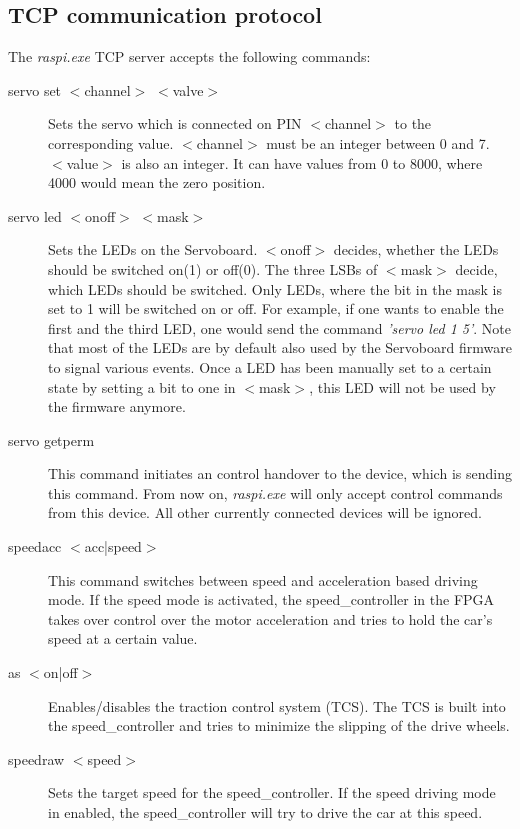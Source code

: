 \documentclass[a4paper
               ,10pt
               ,DIV=10 %
               ,BCOR=0.3cm
               ,pagesize %
               ,headings=small
               ,bibtotoc
               ]
               {scrartcl}
\begin{document}
\subsection{TCP communication protocol}
The \textit{raspi.exe} TCP server accepts the following commands:
\begin{description}
\item[servo set $<$channel$>$ $<$valve$>$] Sets the servo which is connected on PIN $<$channel$>$ to the corresponding value. $<$channel$>$ must be an integer between 0 and 7. $<$value$>$ is also an integer. It can have values from 0 to 8000, where 4000 would mean the zero position.
\item[servo led $<$onoff$>$ $<$mask$>$] Sets the LEDs on the Servoboard. $<$onoff$>$ decides, whether the LEDs should be switched on(1) or off(0). The three LSBs of $<$mask$>$ decide, which LEDs should be switched. Only LEDs, where the bit in the mask is set to 1 will be switched on or off. For example, if one wants to enable the first and the third LED, one would send the command \textit{'servo led 1 5'}. Note that most of the LEDs are by default also used by the Servoboard firmware to signal various events. Once a LED has been manually set to a certain state by setting a bit to one in $<$mask$>$, this LED will not be used by the firmware anymore.
\item[servo getperm] This command initiates an control handover to the device, which is sending this command. From now on, \textit{raspi.exe} will only accept control commands from this device. All other currently connected devices will be ignored.

\item[speedacc $<$acc|speed$>$] This command switches between speed and acceleration based driving mode. If the speed mode is activated, the speed\_controller in the FPGA takes over control over the motor acceleration and tries to hold the car's speed at a certain value.

\item[as $<$on|off$>$] Enables/disables the traction control system (TCS). The TCS is built into the speed\_controller and tries to minimize the slipping of the drive wheels.

\item[speedraw $<$speed$>$] Sets the target speed for the speed\_controller. If the speed driving mode in enabled, the speed\_controller will try to drive the car at this speed.

\end{description}
\end{document}
